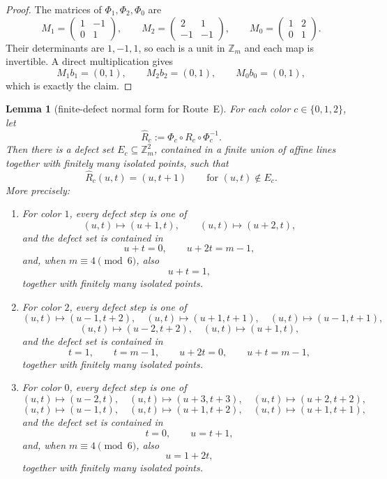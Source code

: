 \documentclass[11pt]{article}
\newtheorem{lemma}{Lemma}
\newcommand{\Zm}{\mathbb Z_m}
\begin{document}
\begin{proof}
The matrices of $\Phi_1,\Phi_2,\Phi_0$ are
\[
M_1=\begin{pmatrix}1&-1\\0&1\end{pmatrix},\qquad
M_2=\begin{pmatrix}2&1\\-1&-1\end{pmatrix},\qquad
M_0=\begin{pmatrix}1&2\\0&1\end{pmatrix}.
\]
Their determinants are $1,-1,1$, so each is a unit in $\Zm$ and each map is invertible.
A direct multiplication gives
\[
M_1b_1=(0,1),\qquad M_2b_2=(0,1),\qquad M_0b_0=(0,1),
\]
which is exactly the claim.
\end{proof}

\begin{lemma}[finite-defect normal form for Route~E]\label{lem:routeE-finite-defect}
For each color $c\in\{0,1,2\}$, let
\[
\widehat R_c:=\Phi_c\circ R_c\circ \Phi_c^{-1}.
\]
Then there is a defect set $E_c\subseteq \Zm^2$, contained in a finite union of affine lines together with finitely many isolated points, such that
\[
\widehat R_c(u,t)=(u,t+1)\qquad\text{for }(u,t)\notin E_c.
\]
More precisely:
\begin{enumerate}[label=\textup{(\roman*)},leftmargin=2.5em]
\item For color $1$, every defect step is one of
\[
(u,t)\mapsto (u+1,t),\qquad (u,t)\mapsto (u+2,t),
\]
and the defect set is contained in
\[
u+t=0,\qquad u+2t=m-1,
\]
and, when $m\equiv 4\pmod 6$, also
\[
u+t=1,
\]
together with finitely many isolated points.

\item For color $2$, every defect step is one of
\[
(u,t)\mapsto (u-1,t+2),\quad (u,t)\mapsto (u+1,t+1),\quad (u,t)\mapsto (u-1,t+1),
\]
\[
(u,t)\mapsto (u-2,t+2),\quad (u,t)\mapsto (u+1,t),
\]
and the defect set is contained in
\[
t=1,\qquad t=m-1,\qquad u+2t=0,\qquad u+t=m-1,
\]
together with finitely many isolated points.

\item For color $0$, every defect step is one of
\[
(u,t)\mapsto (u-2,t),\quad (u,t)\mapsto (u+3,t+3),\quad (u,t)\mapsto (u+2,t+2),
\]
\[
(u,t)\mapsto (u-1,t),\quad (u,t)\mapsto (u+1,t+2),\quad (u,t)\mapsto (u+1,t+1),
\]
and the defect set is contained in
\[
t=0,\qquad u=t+1,
\]
and, when $m\equiv 4\pmod 6$, also
\[
u=1+2t,
\]
together with finitely many isolated points.
\end{enumerate}
\end{lemma}
\end{document}
